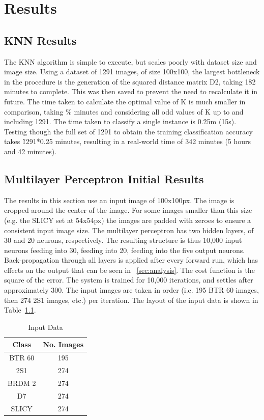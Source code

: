 \chapter{Results}


\section{KNN Results}
The KNN algorithm is simple to execute, but scales poorly with dataset size and image size. Using a dataset of 1291 images, of size 100x100, the largest bottleneck in the procedure is the generation of the squared distance matrix D2, taking 182 minutes to complete. This was then saved to prevent the need to recalculate it in future. The time taken to calculate the optimal value of K is much smaller in comparison, taking \% minutes and considering all odd values of K up to and including 1291. The time taken to classify a single instance is 0.25m (15s). Testing though the full set of 1291 to obtain the training classification accuracy takes \~1291*0.25 minutes, resulting in a real-world time of 342 minutes (5 hours and 42 minutes). 

\section{Multilayer Perceptron Initial Results}
The results in this section use an input image of 100x100px. The image is cropped around the center of the image. For some images smaller than this size (e.g. the SLICY set at 54x54px) the images are padded with zeroes to ensure a consistent input image size. The multilayer perceptron has two hidden layers, of 30 and 20 neurons, respectively. The resulting structure is thus 10,000 input neurons feeding into 30, feeding into 20, feeding into the five output neurons. Back-propagation through all layers is applied after every forward run, which has effects on the output that can be seen in ~\ref{sec:analysis}. The cost function is the square of the error. The system is trained for 10,000 iterations, and settles after approximately 300. The input images are taken in order (i.e. 195 BTR 60 images, then 274 2S1 images, etc.) per iteration. The layout of the input data is shown in Table~\ref{tab:input_data}. \\


\begin{table}
	\centering
	\begin{tabular}{|c|c|}
		\hline
		\textbf{Class} & \textbf{No. Images} \\
		\hline
		
		BTR 60 & 195 \\ \hline
		2S1    & 274 \\ \hline
		BRDM 2 & 274 \\ \hline
		D7     & 274 \\ \hline
		SLICY  & 274 \\ \hline
			
	\end{tabular}
	\caption{Input Data}
	\label{tab:input_data}
	\centering
\end{table}

